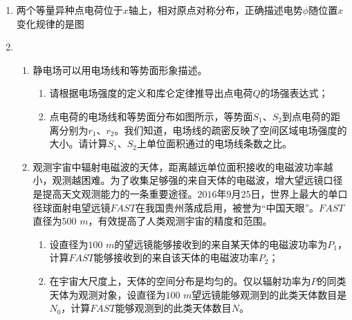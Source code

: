 \begin{enumerate}[leftmargin=0em]
\item
{}
两个等量异种点电荷位于$ x $轴上，相对原点对称分布，正确描述电势$ \phi $随位置$ x $变化规律的是图  
\begin{figure}[h!]
\centering

\end{figure}



\newpage
\item
{}
\begin{enumerate}
\renewcommand{\labelenumi}{\arabic{enumi}.}
\item
静电场可以用电场线和等势面形象描述。
\begin{figure}[h!]
\centering

\end{figure}
\begin{enumerate}
\renewcommand{\labelenumiii}{\alph{enumiii}.}
\item
请根据电场强度的定义和库仑定律推导出点电荷$ Q $的场强表达式；
\item 
点电荷的电场线和等势面分布如图所示，等势面$ S_1 $、$ S_2 $到点电荷的距离分别为$ r_1 $、$ r_2 $。我们知道，电场线的疏密反映了空间区域电场强度的大小。请计算$ S_1 $、$ S_2 $上单位面积通过的电场线条数之比。




\end{enumerate}
\item 
观测宇宙中辐射电磁波的天体，距离越远单位面积接收的电磁波功率越小，观测越困难。为了收集足够强的来自天体的电磁波，增大望远镜口径是提高天文观测能力的一条重要途径。$ 2016 $年$ 9 $月$ 25 $日，世界上最大的单口径球面射电望远镜$ FAST $在我国贵州落成启用，被誉为“中国天眼”。$ FAST $直径为$ 500 $ $ m $，有效提高了人类观测宇宙的精度和范围。

\begin{enumerate}
\renewcommand{\labelenumiii}{\alph{enumiii}.}
\item
设直径为$ 100 $ $ m $的望远镜能够接收到的来自某天体的电磁波功率为$ P_{1} $，计算$ FAST $能够接收到的来自该天体的电磁波功率$ P_{2} $；
\item 
在宇宙大尺度上，天体的空间分布是均匀的。仅以辐射功率为$ P $的同类天体为观测对象，设直径为$ 100 $ $ m $望远镜能够观测到的此类天体数目是$ N_{0} $，计算$ FAST $能够观测到的此类天体数目$ N $。




\end{enumerate}
\end{enumerate}
\end{enumerate}
